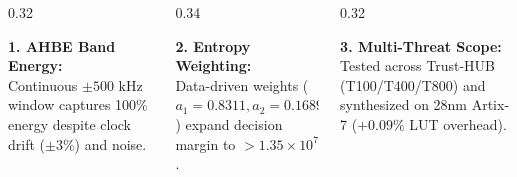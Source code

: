 \documentclass[aspectratio=169,11pt]{beamer}
\begin{document}
\begin{frame}[t]
  \vspace{0.04cm}
  \begin{columns}[T, onlytextwidth]
    \begin{column}{0.32\textwidth}
      \begin{glasscard}[top=2pt, bottom=2pt, left=4pt, right=4pt]
        \textbf{\color{teal!80!black}1. AHBE Band Energy:}\\
        Continuous $\pm 500\text{ kHz}$ window captures 100\% energy despite clock drift ($\pm 3\%$) and noise.
      \end{glasscard}
    \end{column}
    \begin{column}{0.34\textwidth}
      \begin{glasscard}[top=2pt, bottom=2pt, left=4pt, right=4pt]
        \textbf{\color{teal!80!black}2. Entropy Weighting:}\\
        Data-driven weights ($a_1=0.8311, a_2=0.1689$) expand decision margin to $> 1.35 \times 10^7$.
      \end{glasscard}
    \end{column}
    \begin{column}{0.32\textwidth}
      \begin{glasscard}[top=2pt, bottom=2pt, left=4pt, right=4pt]
        \textbf{\color{teal!80!black}3. Multi-Threat Scope:}\\
        Tested across Trust-HUB (T100/T400/T800) and synthesized on 28nm Artix-7 ($+0.09\%$ LUT overhead).
      \end{glasscard}
    \end{column}
  \end{columns}
\end{frame}
\end{document}

